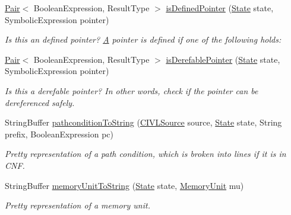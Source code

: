 \begin{DoxyCompactItemize}
\item 
\hyperlink{classedu_1_1udel_1_1cis_1_1vsl_1_1civl_1_1util_1_1IF_1_1Pair}{Pair}$<$ Boolean\+Expression, Result\+Type $>$ \hyperlink{interfaceedu_1_1udel_1_1cis_1_1vsl_1_1civl_1_1semantics_1_1IF_1_1SymbolicAnalyzer_a35562b6847f9b51a92e628bb2e855021}{is\+Defined\+Pointer} (\hyperlink{interfaceedu_1_1udel_1_1cis_1_1vsl_1_1civl_1_1state_1_1IF_1_1State}{State} state, Symbolic\+Expression pointer)
\begin{DoxyCompactList}\small\item\em Is this an defined pointer? \hyperlink{structA}{A} pointer is defined if one of the following holds\+: \end{DoxyCompactList}\item 
\hyperlink{classedu_1_1udel_1_1cis_1_1vsl_1_1civl_1_1util_1_1IF_1_1Pair}{Pair}$<$ Boolean\+Expression, Result\+Type $>$ \hyperlink{interfaceedu_1_1udel_1_1cis_1_1vsl_1_1civl_1_1semantics_1_1IF_1_1SymbolicAnalyzer_a2a6e4f37a41fcf3bfa5fc3a629f561bf}{is\+Derefable\+Pointer} (\hyperlink{interfaceedu_1_1udel_1_1cis_1_1vsl_1_1civl_1_1state_1_1IF_1_1State}{State} state, Symbolic\+Expression pointer)
\begin{DoxyCompactList}\small\item\em Is this a derefable pointer? In other words, check if the pointer can be dereferenced safely. \end{DoxyCompactList}\item 
String\+Buffer \hyperlink{interfaceedu_1_1udel_1_1cis_1_1vsl_1_1civl_1_1semantics_1_1IF_1_1SymbolicAnalyzer_a651a2000d266dae34dd1eafa7956d879}{pathcondition\+To\+String} (\hyperlink{interfaceedu_1_1udel_1_1cis_1_1vsl_1_1civl_1_1model_1_1IF_1_1CIVLSource}{C\+I\+V\+L\+Source} source, \hyperlink{interfaceedu_1_1udel_1_1cis_1_1vsl_1_1civl_1_1state_1_1IF_1_1State}{State} state, String prefix, Boolean\+Expression pc)
\begin{DoxyCompactList}\small\item\em Pretty representation of a path condition, which is broken into lines if it is in C\+N\+F. \end{DoxyCompactList}\item 
String\+Buffer \hyperlink{interfaceedu_1_1udel_1_1cis_1_1vsl_1_1civl_1_1semantics_1_1IF_1_1SymbolicAnalyzer_aa28325c0cd68fc78ccaf283ba8e9292e}{memory\+Unit\+To\+String} (\hyperlink{interfaceedu_1_1udel_1_1cis_1_1vsl_1_1civl_1_1state_1_1IF_1_1State}{State} state, \hyperlink{interfaceedu_1_1udel_1_1cis_1_1vsl_1_1civl_1_1state_1_1IF_1_1MemoryUnit}{Memory\+Unit} mu)
\begin{DoxyCompactList}\small\item\em Pretty representation of a memory unit. \end{DoxyCompactList}\end{DoxyCompactItemize}




